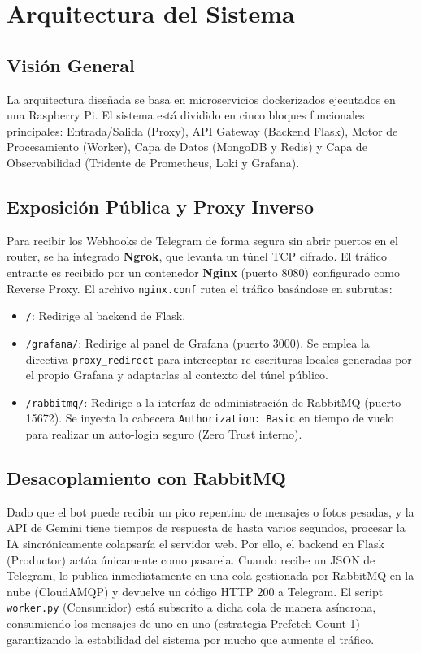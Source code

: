 \section{Arquitectura del Sistema}
\label{sec:arquitectura}

\subsection{Visión General}
La arquitectura diseñada se basa en microservicios dockerizados ejecutados en una Raspberry Pi. El sistema está dividido en cinco bloques funcionales principales: Entrada/Salida (Proxy), API Gateway (Backend Flask), Motor de Procesamiento (Worker), Capa de Datos (MongoDB y Redis) y Capa de Observabilidad (Tridente de Prometheus, Loki y Grafana).

\subsection{Exposición Pública y Proxy Inverso}
Para recibir los Webhooks de Telegram de forma segura sin abrir puertos en el router, se ha integrado \textbf{Ngrok}, que levanta un túnel TCP cifrado. 
El tráfico entrante es recibido por un contenedor \textbf{Nginx} (puerto 8080) configurado como Reverse Proxy.
El archivo \texttt{nginx.conf} rutea el tráfico basándose en subrutas:
\begin{itemize}
    \item \texttt{/}: Redirige al backend de Flask.
    \item \texttt{/grafana/}: Redirige al panel de Grafana (puerto 3000). Se emplea la directiva \texttt{proxy\_redirect} para interceptar re-escrituras locales generadas por el propio Grafana y adaptarlas al contexto del túnel público.
    \item \texttt{/rabbitmq/}: Redirige a la interfaz de administración de RabbitMQ (puerto 15672). Se inyecta la cabecera \texttt{Authorization: Basic} en tiempo de vuelo para realizar un auto-login seguro (Zero Trust interno).
\end{itemize}

\subsection{Desacoplamiento con RabbitMQ}
Dado que el bot puede recibir un pico repentino de mensajes o fotos pesadas, y la API de Gemini tiene tiempos de respuesta de hasta varios segundos, procesar la IA sincrónicamente colapsaría el servidor web.
Por ello, el backend en Flask (Productor) actúa únicamente como pasarela. Cuando recibe un JSON de Telegram, lo publica inmediatamente en una cola gestionada por RabbitMQ en la nube (CloudAMQP) y devuelve un código HTTP 200 a Telegram.
El script \texttt{worker.py} (Consumidor) está subscrito a dicha cola de manera asíncrona, consumiendo los mensajes de uno en uno (estrategia Prefetch Count 1) garantizando la estabilidad del sistema por mucho que aumente el tráfico.

